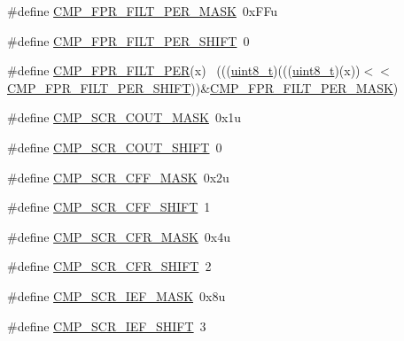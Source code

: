 \begin{DoxyCompactItemize}
\item 
\#define \hyperlink{group___c_m_p___register___masks_gaf8ca758656c156ecadfbb6f9e57a3eef}{C\+M\+P\+\_\+\+F\+P\+R\+\_\+\+F\+I\+L\+T\+\_\+\+P\+E\+R\+\_\+\+M\+A\+SK}~0x\+F\+Fu
\item 
\#define \hyperlink{group___c_m_p___register___masks_gaa563be7a82c0c1e3802e7ac7c920bf3a}{C\+M\+P\+\_\+\+F\+P\+R\+\_\+\+F\+I\+L\+T\+\_\+\+P\+E\+R\+\_\+\+S\+H\+I\+FT}~0
\item 
\#define \hyperlink{group___c_m_p___register___masks_ga64552c5393c5361b4e87fae0df10308e}{C\+M\+P\+\_\+\+F\+P\+R\+\_\+\+F\+I\+L\+T\+\_\+\+P\+ER}(x)                                        ~(((\hyperlink{_p_e___types_8h_aba7bc1797add20fe3efdf37ced1182c5}{uint8\+\_\+t})(((\hyperlink{_p_e___types_8h_aba7bc1797add20fe3efdf37ced1182c5}{uint8\+\_\+t})(x))$<$$<$\hyperlink{group___c_m_p___register___masks_gaa563be7a82c0c1e3802e7ac7c920bf3a}{C\+M\+P\+\_\+\+F\+P\+R\+\_\+\+F\+I\+L\+T\+\_\+\+P\+E\+R\+\_\+\+S\+H\+I\+FT}))\&\hyperlink{group___c_m_p___register___masks_gaf8ca758656c156ecadfbb6f9e57a3eef}{C\+M\+P\+\_\+\+F\+P\+R\+\_\+\+F\+I\+L\+T\+\_\+\+P\+E\+R\+\_\+\+M\+A\+SK})
\item 
\#define \hyperlink{group___c_m_p___register___masks_ga024aec72a28ecdc04a1441cd7a3af23a}{C\+M\+P\+\_\+\+S\+C\+R\+\_\+\+C\+O\+U\+T\+\_\+\+M\+A\+SK}~0x1u
\item 
\#define \hyperlink{group___c_m_p___register___masks_gaa508076192a6b9aed5c4d46282c64394}{C\+M\+P\+\_\+\+S\+C\+R\+\_\+\+C\+O\+U\+T\+\_\+\+S\+H\+I\+FT}~0
\item 
\#define \hyperlink{group___c_m_p___register___masks_gaab44e3da0576b12dd809881323944a1c}{C\+M\+P\+\_\+\+S\+C\+R\+\_\+\+C\+F\+F\+\_\+\+M\+A\+SK}~0x2u
\item 
\#define \hyperlink{group___c_m_p___register___masks_ga076d455f0d5bdad02282cbcce6e04c01}{C\+M\+P\+\_\+\+S\+C\+R\+\_\+\+C\+F\+F\+\_\+\+S\+H\+I\+FT}~1
\item 
\#define \hyperlink{group___c_m_p___register___masks_ga876bfa2799338c6b10b152940d25c4a7}{C\+M\+P\+\_\+\+S\+C\+R\+\_\+\+C\+F\+R\+\_\+\+M\+A\+SK}~0x4u
\item 
\#define \hyperlink{group___c_m_p___register___masks_ga78595d16db987c96e73ce96fc5436f6b}{C\+M\+P\+\_\+\+S\+C\+R\+\_\+\+C\+F\+R\+\_\+\+S\+H\+I\+FT}~2
\item 
\#define \hyperlink{group___c_m_p___register___masks_gab36859944bb484db243358bb9a1a9692}{C\+M\+P\+\_\+\+S\+C\+R\+\_\+\+I\+E\+F\+\_\+\+M\+A\+SK}~0x8u
\item 
\#define \hyperlink{group___c_m_p___register___masks_gaa9d242eac081d0d572e120ea3afa0e6f}{C\+M\+P\+\_\+\+S\+C\+R\+\_\+\+I\+E\+F\+\_\+\+S\+H\+I\+FT}~3
$$
\end{DoxyCompactItemize}
